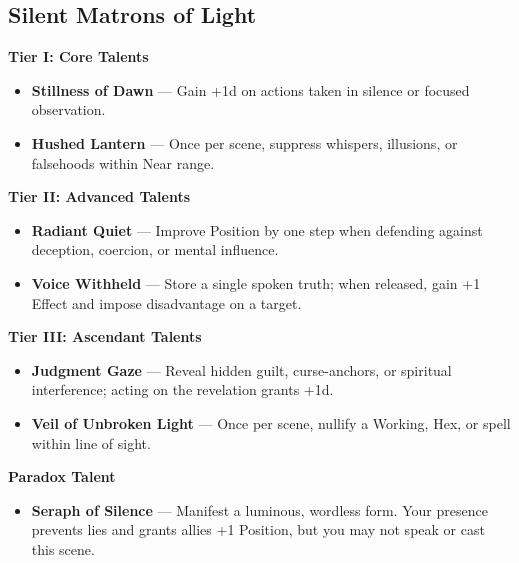 \documentclass[11pt]{book}
\begin{document}
\subsection*{Silent Matrons of Light}
\begin{tcolorbox}[colback=mistgray!10,colframe=softgold,title={Silent Matrons of Light --- Talents}]

\textbf{Tier I: Core Talents}
\begin{itemize}[noitemsep]
  \item \textbf{Stillness of Dawn} --- Gain +1d on actions taken in silence or focused observation.
  \item \textbf{Hushed Lantern} --- Once per scene, suppress whispers, illusions, or falsehoods within Near range.
\end{itemize}

\textbf{Tier II: Advanced Talents}
\begin{itemize}[noitemsep]
  \item \textbf{Radiant Quiet} --- Improve Position by one step when defending against deception, coercion, or mental influence.
  \item \textbf{Voice Withheld} --- Store a single spoken truth; when released, gain +1 Effect and impose disadvantage on a target.
\end{itemize}

\textbf{Tier III: Ascendant Talents}
\begin{itemize}[noitemsep]
  \item \textbf{Judgment Gaze} --- Reveal hidden guilt, curse-anchors, or spiritual interference; acting on the revelation grants +1d.
  \item \textbf{Veil of Unbroken Light} --- Once per scene, nullify a Working, Hex, or spell within line of sight.
\end{itemize}

\textbf{Paradox Talent}
\begin{itemize}[noitemsep]
  \item \textbf{Seraph of Silence} --- Manifest a luminous, wordless form. Your presence prevents lies and grants allies +1 Position, but you may not speak or cast this scene.
\end{itemize}

\end{tcolorbox}

\end{document}
